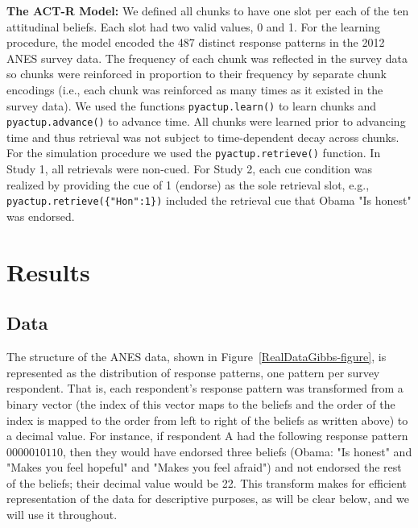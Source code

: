 \documentclass[10pt,letterpaper]{article}
\begin{document}
\noindent
\textbf{The ACT-R Model:} We defined all chunks to have one slot per each of the ten attitudinal beliefs.  Each slot had two valid values, 0 and 1.  For the learning procedure, the model encoded the 487 distinct response patterns in the 2012 ANES survey data. The frequency of each chunk was reflected in the survey data so chunks were reinforced in proportion to their frequency by separate chunk encodings (i.e., each chunk was reinforced as many times as it existed in the survey data). We used the functions \texttt{pyactup.learn()} to learn chunks and \texttt{pyactup.advance()} to advance time.  All chunks were learned prior to advancing time and thus retrieval was not subject to time-dependent decay across chunks.  For the simulation procedure we used the \texttt{pyactup.retrieve()} function.  In Study 1, all retrievals were non-cued.  For Study 2, each cue condition was realized by providing the cue of 1 (endorse) as the sole retrieval slot, e.g., \texttt{pyactup.retrieve(\{"Hon":1\})} included the retrieval cue that Obama "Is honest" was endorsed.  

\section{Results}
\subsection{Data}
The structure of the ANES data, shown in Figure~\ref{RealDataGibbs-figure}, is represented as the distribution of response patterns, one pattern per survey respondent.  That is, each respondent's response pattern was transformed from a binary vector (the index of this vector maps to the beliefs and the order of the index is mapped to the order from left to right of the beliefs as written above) to a decimal value. For instance, if respondent A had the following response pattern $0000010110$, then they would have endorsed three beliefs (Obama: "Is honest" and "Makes you feel hopeful" and "Makes you feel afraid") and not endorsed the rest of the beliefs; their decimal value would be 22. This transform makes for efficient representation of the data for descriptive purposes, as will be clear below, and we will use it throughout.  
\end{document}
